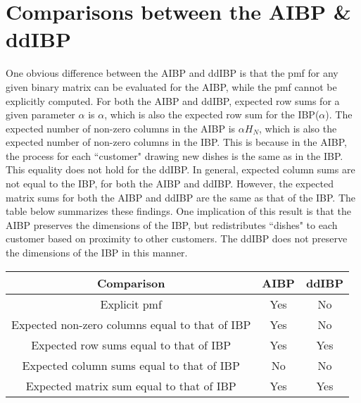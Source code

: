 \section{Comparisons between the AIBP \& ddIBP}
One obvious difference between the AIBP and ddIBP is that the pmf for any given 
binary matrix can be evaluated for the AIBP, while the pmf cannot be explicitly 
computed. For both the AIBP and ddIBP, expected row sums for a given parameter
$\alpha$ is $\alpha$, which is also the expected row sum for the IBP($\alpha$). 
The expected number of non-zero columns in the AIBP is $\alpha H_N$, which is also
the expected number of non-zero columns in the IBP. This is because in the AIBP,
the process for each ``customer" drawing new dishes is the same as in the IBP. This
equality does not hold for the ddIBP. In general, expected column sums are not
equal to the IBP, for both the AIBP and ddIBP. However, the expected matrix
sums for both the AIBP and ddIBP are the same as that of the IBP. The table below 
summarizes these findings. One implication of this result is that the AIBP 
preserves the dimensions of the IBP, but redistributes ``dishes" to each customer
based on proximity to other customers. The ddIBP does not preserve the dimensions
of the IBP in this manner. \\

\begin{center}
  \begin{tabular}{c|c|c}
    \hline
      Comparison & AIBP & ddIBP \\ \hline \hline
      Explicit pmf & Yes & No \\ \hline
      Expected non-zero columns equal to that of IBP & Yes & No \\ \hline
      Expected row sums equal to that of IBP & Yes & Yes \\ \hline
      Expected column sums equal to that of IBP & No & No \\ \hline
      Expected matrix sum equal to that of IBP & Yes & Yes \\ \hline
    \hline
  \end{tabular}
\end{center}

